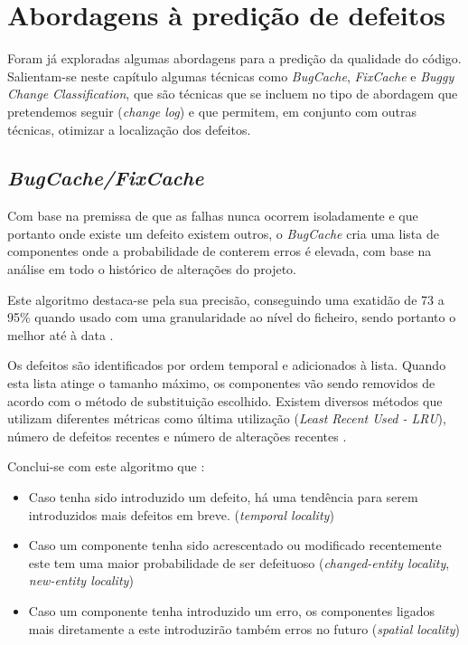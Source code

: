 \section{Abordagens à predição de defeitos}

Foram já exploradas algumas abordagens para a predição da qualidade do código. Salientam-se neste capítulo algumas técnicas como \emph{BugCache}, \emph{FixCache} e \emph{Buggy Change Classification}, que são técnicas que se incluem no tipo de abordagem que pretendemos seguir (\emph{change log}) e que permitem, em conjunto com outras técnicas, otimizar a localização dos defeitos.

\subsection{\emph{BugCache/FixCache}}

Com base na premissa de que as falhas nunca ocorrem isoladamente e que portanto onde existe um defeito existem outros, o \emph{BugCache} cria uma lista de componentes onde a probabilidade de conterem erros é elevada, com base na análise em todo o histórico de alterações do projeto.

Este algoritmo destaca-se pela sua precisão, conseguindo uma exatidão de 73 a 95\% quando usado com uma granularidade ao nível do ficheiro, sendo portanto o melhor até à data \cite{Kim2006}.

Os defeitos são identificados por ordem temporal e adicionados à lista. Quando esta lista atinge o tamanho máximo, os componentes vão sendo removidos de acordo com o método de substituição escolhido. Existem diversos métodos que utilizam diferentes métricas como última utilização (\emph{Least Recent Used - LRU}), número de defeitos recentes e número de alterações recentes \cite{Kim2006}.

Conclui-se com este algoritmo que \cite{Kim2006}:
%
\begin{itemize}
	\item Caso tenha sido introduzido um defeito, há uma tendência para serem introduzidos mais defeitos em breve. (\emph{temporal locality})
	\item Caso um componente tenha sido acrescentado ou modificado recentemente este tem uma maior probabilidade de ser defeituoso (\emph{changed-entity locality}, \emph{new-entity locality})
	\item Caso um componente tenha introduzido um erro, os componentes ligados mais diretamente a este introduzirão também erros no futuro (\emph{spatial locality})
\end{itemize}

